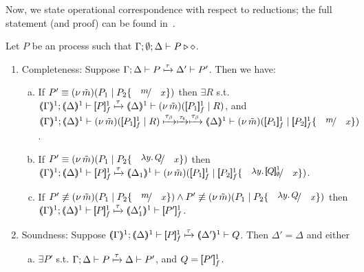 \documentclass[runningheads]{llncs}
\begin{document}
{{Now, we state operational correspondence with respect to reductions; 
the full statement (and proof) can be found in~\cite{KouzapasPY15}.

\begin{proposition}%
	\label{prop:op_corr_HOp_to_HO}
	Let $P$ be an \HOp process such that $\Gamma; \emptyset; \Delta \vdash P \triangleright \diamond$.
	\begin{enumerate}[1.]
		\item Completeness: 
			Suppose $\Gamma; \Delta \vdash P \xmapsto{\tau} \Delta' \vdash P'$. Then we have:
%
			\begin{enumerate}[a)]
				\item
					If  $P' \scong \newsp{\tilde{m}}{P_1 \Par P_2\subst{m}{x}}$
					then $\exists R$ s.t. \\
					$\horel{\tmap{\Gamma}{1}}{\tmap{\Delta}{1}}{\pmapp{P}{1}{f}}{\hby{\tau}}{\mapt{\Delta}^{1}}{\newsp{\tilde{m}}{\pmapp{P_1}{1}{f} \Par R}}$,
					and\\ 
					$\horel{\tmap{\Gamma}{1}}{\tmap{\Delta}{1}}{\newsp{\tilde{m}}{\pmapp{P_1}{1}{f} \Par R}}{\hby{\btau} \hby{\stau} \hby{\btau}}
					{\mapt{\Delta}^{1}}{\newsp{\tilde{m}}{\pmapp{P_1}{1}{f} \Par \pmapp{P_2}{1}{f}\subst{m}{x}}}$.
			
				\item
					If  $P' \scong \newsp{\tilde{m}}{P_1 \Par P_2 \subst{\abs{y}Q}{x}}$
					then \\
					$\horel{\tmap{\Gamma}{1}}{\tmap{\Delta}{1}}{\pmapp{P}{1}{f}}{\hby{\tau}}
					{\tmap{\Delta_1}{1}}{\newsp{\tilde{m}}{\pmapp{P_1}{1}{f}\Par \pmapp{P_2}{1}{f}\subst{\abs{y}\pmapp{Q}{1}{\emptyset}}{x}}}$.
			
				\item
					If   $P' \not\scong \newsp{\tilde{m}}{P_1 \Par P_2 \subst{m}{x}} \land P' \not\scong \newsp{\tilde{m}}{P_1 \Par P_2\subst{\abs{y}Q}{x}}$
					then \\
					$\horel{\tmap{\Gamma}{1}}{\tmap{\Delta}{1}}{\pmapp{P}{1}{f}}{\hby{\tau}}{\tmap{\Delta'_1}{1}}{ \pmapp{P'}{1}{f}}$.
			\end{enumerate}
			
		\item Soundness:	Suppose $\horel{\tmap{\Gamma}{1}}{\tmap{\Delta}{1}}{\pmapp{P}{1}{f}}{\hby{\tau}}{\tmap{\Delta'}{1}}{Q}$.
			Then $\Delta' = \Delta$ and 
					either
%
					\begin{enumerate}[a)]
						\item	$\exists P'$ s.t. 
							$\Gamma; \Delta \vdash P \xmapsto{\tau} \Delta \vdash P'$,
							and $Q = [\!\![P']\!\!]^{1}_f$.	


\end{enumerate}
\end{enumerate}
\end{proposition}}}
\end{document}
